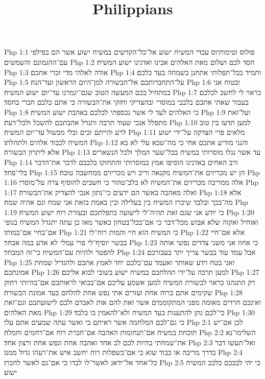 

\title{Philippians}

Php 1:1  פולוס וטימותיוס עבדי המשיח ישוע אל־כל־הקדשים במשיח ישוע אשר הם בפילפי עם־ההגמונם והשמשים׃
Php 1:2  חסד לכם ושלום מאת האלהים אבינו ואדנינו ישוע המשיח׃
Php 1:3  אודה לאלהי מדי זכרי אתכם׃
Php 1:4  ותמיד בכל־תפלותי אתחנן בשמחה בעד כלכם׃
Php 1:5  על־התחברותכם אל־הבשורה למן־היום הראשון ועד־הנה׃
Php 1:6  ובטוח אני במתחיל בכם המעשה הטוב שגם־יגמרנו עד־יום ישוע המשיח׃
Php 1:7  כראוי לי לחשב לכלכם בעבור שאתי אתכם בלבבי במוסרי ובהצדיקי וחזקי את־הבשורה כי אתם כלכם חברי בחסד׃
Php 1:8  כי האלהים לעד לי אשר נכספתי לכלכם באהבת ישוע המשיח׃
Php 1:9  ועל־זאת מתפלל אנכי שעוד תרבה ותגדל אהבתכם להשכל ולכל־דעת׃
Php 1:10  למען תדעו בין טוב לרע והייתם זכים ובלי מכשול עד־יום המשיח׃
Php 1:11  מלאים פרי הצדקה על־ידי ישוע המשיח לכבוד אלהים ולתהלתו׃
Php 1:12  והנני מודיע אתכם אחי כי מה־שבא עלי לא בא אלא ליתרון הבשורה׃
Php 1:13  עד אשר נגלו מוסרותי במשיח בכל־שער המלך ולכל הנשארים׃
Php 1:14  ורב האחים באדנינו הוסיפו אמץ במוסרותי והתחזקו בלבבם לדבר את־הדבר בלי־פחד׃
Php 1:15  הן יש מכריזים את־המשיח מקנאה וריב ויש מכריזים ממחשבה טובה׃
Php 1:16  אלה ממריבה מכריזים את־המשיח לא בלב־טהור כי חשבים להוסיף צרה על־מוסרי׃
Php 1:17  ואלה מאהבה באשר הם ידעים כי־נתון אנכי להצדיק את־הבשורה׃
Php 1:18  אלא מה־בכך ובלבד שיכרז המשיח בין בעלילה ובין באמת בזאת אני שמח וגם אהיה שמח׃
Php 1:19  כי יודע אני שגם זאת תהיה־לי לישועה בתפלתכם ובעזרת רוח ישוע המשיח׃
Php 1:20  ואוחיל ואקוה שלא אבוש מכל־דבר כי אם־בכל־בטחון כאשר מאז כן עתה יתגדל המשיח בגופי אם־בחיי אם־במותי׃
Php 1:21  כי המשיח הוא חיי והמות רוח־לי׃
Php 1:22  אלא אם־חיי בבשר יוסיף־לי פרי עמלי לא אדע במה אבחר׃
Php 1:23  כי אחוז אני משני צדדים נפשי אותה להפטר ולהיות עם־המשיח כי־זה המבחר׃
Php 1:24  אבל עמד עוד בבשר צריך יתר בעבורכם׃
Php 1:25  ואני בטח וידע שאותר ואעמד עם־כלכם יחד לאמץ אתכם ולהגדיל שמחת אמונתכם׃
Php 1:26  למען תרבה על־ידי תהלתכם במשיח ישוע בשובי לבוא אליכם׃
Php 1:27  רק התנהגו כראוי לבשורת המשיח למען אשמע עליכם אם־בבואי לראותכם אם־בהיותי רחוק שקימים אתם ברוח אחת ועזרים אתי נפש אחת להלחם בעד אמונת הבשורה׃
Php 1:28  ואינכם חרדים מאומה מפני המתקוממים אשר זאת להם אות לאבדם ולכם לישועתכם וגם־זאת מאת האלהים׃
Php 1:29  כי־לכם נתן להתענות בעד המשיח ולא־להאמין בו בלבד׃
Php 1:30  כי גם־לכם המלחמה אשר ראיתם בי ואשר עתה שמעים אתם עלי׃
Php 2:1  לכן אם־יש תוכחת במשיח אם־תנחומות האהבה אם־חברת רוח אם־רחמים וחמלה׃
Php 2:2  השלימו־נא את־שמחתי בהיות לכם לב אחד ואהבה אחת ונפש אחת ורצון אחד׃
Php 2:3  ואל־תעשו דבר בדרך מריבה או כבוד שוא כי אם־בשפלות רוח יחשב איש את־רעהו גדול ממנו׃
Php 2:4  כל־אחד אל־ידאג לאשר־לו לבדו כי אם־גם לאשר לחברו׃
Php 2:5  כי יהי לבבכם כלבב המשיח ישוע׃
